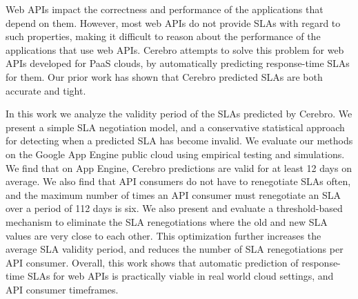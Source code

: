 Web APIs impact the correctness and performance of the applications that depend on them.
However, most web APIs do not provide SLAs with regard to such properties, making it
difficult to reason about the performance of the applications that use web APIs. Cerebro attempts
to solve this problem for web APIs developed for PaaS clouds, by automatically predicting
response-time SLAs for them. Our prior work has shown that Cerebro predicted SLAs are
both accurate and tight.

In this work we analyze the validity period of the SLAs predicted by Cerebro. We present a simple
SLA negotiation model, and a conservative statistical approach for detecting when a predicted SLA has become
invalid. We evaluate our methods on the Google App Engine public cloud using empirical testing
and simulations. We find that on App Engine, Cerebro predictions are valid for at least 12 days
on average. We also find that API consumers do not have to renegotiate SLAs often, and the maximum
number of times an API consumer must renegotiate an SLA over a period of 112 days is six. We
also present and evaluate a threshold-based mechanism to eliminate the SLA renegotiations where
the old and new SLA values are very close to each other. This optimization further increases
the average SLA validity period, and reduces the number of SLA renegotiations per API consumer.
Overall, this work shows that automatic prediction of response-time SLAs for web APIs is practically
viable in real world cloud settings, and API consumer timeframes. 